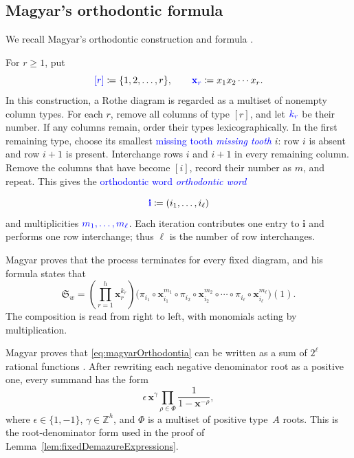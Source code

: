 \documentclass[11pt,reqno]{amsart}
\theoremstyle{definition}
\newcommand{\setZ}{\mathbb{Z}}
\newcommand{\xvec}{\mathbf{x}}
\newcommand{\schubertS}{\mathfrak{S}}
\newcommand{\defin}[1]{%
  \relax\ifmmode%
  \textcolor{blue}{#1}%
  \else\textcolor{blue}{\emph{#1}}%
  \fi%
}
\begin{document}
\subsection{Magyar's orthodontic formula}

We recall Magyar's orthodontic construction and formula
\cite[Sec.~4.3 and Prop.~15]{Magyar1998SchubertBottSamelson}.

For \(r\geq1\), put
\[
\defin{[r]}\coloneqq\{1,2,\dotsc,r\},
\qquad
\defin{\xvec_r}\coloneqq x_1x_2\dotsm x_r.
\]
In this construction, a Rothe diagram is regarded as a multiset of nonempty
column types.  For each \(r\), remove all columns of type \([r]\), and let
\(\defin{k_r}\) be their number.  If any columns remain, order their types
lexicographically.  In the first remaining type, choose its
smallest \defin{missing tooth} \(i\): row \(i\) is absent and row \(i+1\) is
present.
Interchange rows \(i\) and \(i+1\) in every remaining column.  Remove the
columns that have become \([i]\), record their number as \(m\), and
repeat.  This gives the \defin{orthodontic word}
\[
\defin{\mathbf{i}}\coloneqq(i_1,\dotsc,i_\ell)
\]
and multiplicities \(\defin{m_1,\dotsc,m_\ell}\).  Each iteration contributes
one entry to \(\mathbf{i}\) and performs one row interchange; thus \(\ell\) is
the number of row interchanges.

Magyar proves that the process terminates for every fixed diagram, and his
formula states that
\begin{equation}
\label{eq:magyarOrthodontia}
\schubertS_w
=
\left(\prod_{r=1}^h\xvec_r^{k_r}\right)
\bigl(
\pi_{i_1}\circ \xvec_{i_1}^{m_1}
\circ\pi_{i_2}\circ \xvec_{i_2}^{m_2}
\circ\dotsm
\circ\pi_{i_\ell}\circ \xvec_{i_\ell}^{m_\ell}
\bigr)(1).
\end{equation}
The composition is read from right to left, with monomials acting by
multiplication.

Magyar proves that \eqref{eq:magyarOrthodontia} can be written as a sum of
\(2^\ell\) rational functions
\cite[Thm.~3]{Magyar1998SchubertBottSamelson}.
After rewriting each negative denominator root as a positive one, every
summand has the form
\begin{equation}
\label{eq:magyarRationalTerm}
\epsilon\,\xvec^\gamma
\prod_{\rho\in\Phi}\frac{1}{1-\xvec^{-\rho}},
\end{equation}
where \(\epsilon\in\{1,-1\}\), \(\gamma\in\setZ^h\), and \(\Phi\) is a
multiset of positive type~\(A\) roots.  This is the root-denominator form
used in the proof of Lemma~\ref{lem:fixedDemazureExpressions}.
\end{document}
